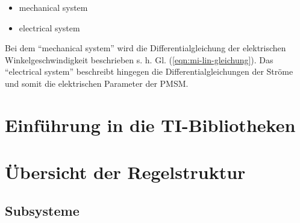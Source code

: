 \begin{itemize}
	\item mechanical system
	\item electrical system
\end{itemize}

Bei dem \enquote{mechanical system} wird die Differentialgleichung der elektrischen Winkelgeschwindigkeit beschrieben s. h. Gl. (\ref{eqn:mi-lin-gleichung}).
Das \enquote{electrical system} beschreibt hingegen die Differentialgleichungen der Ströme und somit die elektrischen Parameter der PMSM.



\section{Einführung in die TI-Bibliotheken}\label{sec:TI}

\section{Übersicht der Regelstruktur}\label{sec:ueberregelung}

\subsection{Subsysteme}





